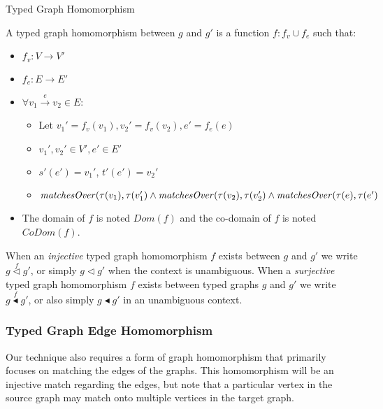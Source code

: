 \begin{definition}{Typed Graph Homomorphism\\}
\label{def:typed_graph_homomorphism}

A typed graph homomorphism between $g$ and $g'$ is a function $f: f_v \cup f_e$ such that:
\begin{itemize}
\item $f_v: V\rightarrow V'$
\item $f_e: E\rightarrow E'$
\item $\forall v_1 \xrightarrow{e} v_2\in E$:
\begin{itemize}
\item Let $ v_1' = f_v(v_1), v_2' = f_v(v_2), e' = f_e(e)$
\item $v_1', v_2' \in V', e' \in E'$
\item $s'(e') = v_1'$, $t'(e') = v_2'$
\item $\mathit{matchesOver}(\tau(v_1), \tau(v_1') \land \\\mathit{matchesOver}(\tau(v_2), \tau(v_2') \land\\ \mathit{matchesOver}(\tau(e), \tau(e')$
\end{itemize}

\item The domain of $f$ is noted $Dom(f)$ and the co-domain of $f$ is noted $CoDom(f)$.
\end{itemize}  
\end{definition}

 When an \emph{injective} typed graph homomorphism $f$ exists between $g$ and $g'$ we write $g \stackrel{f}{\vartriangleleft} g'$, or simply $g \vartriangleleft g'$ when the context is unambiguous. When a \emph{surjective} typed graph homomorphism $f$ exists between typed graphs $g$ and $g'$ we write $g \stackrel{f}{\blacktriangleleft} g'$, or also simply $g \blacktriangleleft g'$ in an unambiguous context. 

\subsubsection*{Typed Graph Edge Homomorphism}

Our technique also requires a form of graph homomorphism that primarily focuses on matching the edges of the graphs. This homomorphism will be an injective match regarding the edges, but note that a particular vertex in the source graph may match onto multiple vertices in the target graph. 

